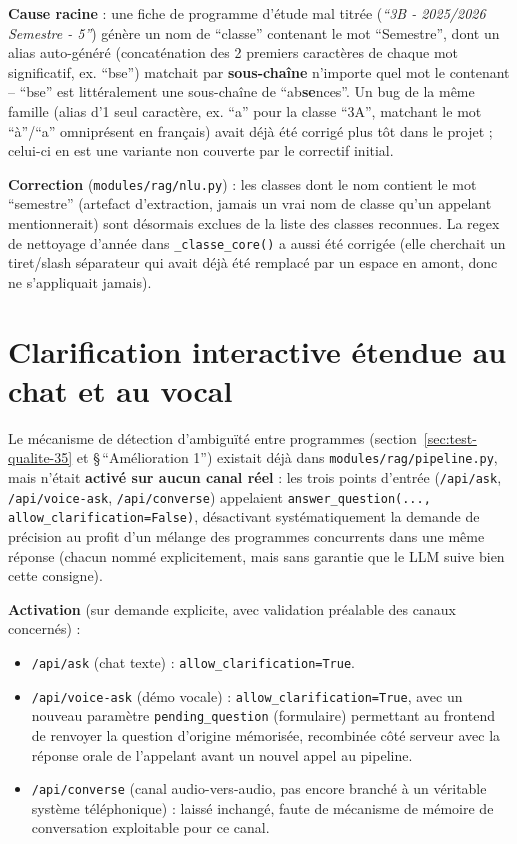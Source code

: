 \documentclass[11pt,a4paper]{report}
\begin{document}
\textbf{Cause racine} : une fiche de programme d'étude mal titrée
(\emph{``3B - 2025/2026 Semestre - 5''}) génère un nom de ``classe'' contenant le mot
``Semestre'', dont un alias auto-généré (concaténation des 2 premiers caractères de
chaque mot significatif, ex. ``bse'') matchait par \textbf{sous-chaîne} n'importe quel mot
le contenant -- ``bse'' est littéralement une sous-chaîne de ``ab\textbf{se}nces''. Un bug
de la même famille (alias d'1 seul caractère, ex. ``a'' pour la classe ``3A'', matchant le
mot ``à''/``a'' omniprésent en français) avait déjà été corrigé plus tôt dans le projet ;
celui-ci en est une variante non couverte par le correctif initial.

\textbf{Correction} (\texttt{modules/rag/nlu.py}) : les classes dont le nom contient le
mot ``semestre'' (artefact d'extraction, jamais un vrai nom de classe qu'un appelant
mentionnerait) sont désormais exclues de la liste des classes reconnues. La regex de
nettoyage d'année dans \texttt{\_classe\_core()} a aussi été corrigée (elle cherchait un
tiret/slash séparateur qui avait déjà été remplacé par un espace en amont, donc ne
s'appliquait jamais).

\section{Clarification interactive étendue au chat et au vocal}
\label{sec:clarification-chat-vocal}
Le mécanisme de détection d'ambiguïté entre programmes (section~\ref{sec:test-qualite-35}
et \S\,``Amélioration 1'') existait déjà dans \texttt{modules/rag/pipeline.py}, mais
n'était \textbf{activé sur aucun canal réel} : les trois points d'entrée
(\texttt{/api/ask}, \texttt{/api/voice-ask}, \texttt{/api/converse}) appelaient
\texttt{answer\_question(..., allow\_clarification=False)}, désactivant systématiquement
la demande de précision au profit d'un mélange des programmes concurrents dans une même
réponse (chacun nommé explicitement, mais sans garantie que le LLM suive bien cette
consigne).

\textbf{Activation} (sur demande explicite, avec validation préalable des canaux
concernés) :
\begin{itemize}
    \item \texttt{/api/ask} (chat texte) : \texttt{allow\_clarification=True}.
    \item \texttt{/api/voice-ask} (démo vocale) : \texttt{allow\_clarification=True},
    avec un nouveau paramètre \texttt{pending\_question} (formulaire) permettant au
    frontend de renvoyer la question d'origine mémorisée, recombinée côté serveur avec
    la réponse orale de l'appelant avant un nouvel appel au pipeline.
    \item \texttt{/api/converse} (canal audio-vers-audio, pas encore branché à un
    véritable système téléphonique) : laissé inchangé, faute de mécanisme de mémoire de
    conversation exploitable pour ce canal.
\end{itemize}
\end{document}
